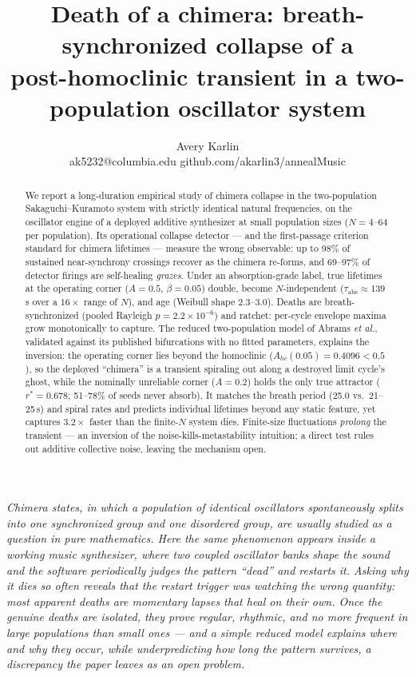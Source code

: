 \documentclass[11pt]{article}
\title{\bfseries Death of a chimera: breath-synchronized collapse of a\\ post-homoclinic transient in a two-population oscillator system}
\author{Avery Karlin\\ \small ak5232@columbia.edu \quad github.com/akarlin3/annealMusic}
\date{}
\begin{document}
\maketitle

\begin{abstract}
\noindent
We report a long-duration empirical study of chimera collapse in the two-population
Sakaguchi--Kuramoto system with strictly identical natural frequencies, on the
oscillator engine of a deployed additive synthesizer at small population sizes
($N = 4$--$64$ per population). Its operational collapse detector --- and the
first-passage criterion standard for chimera lifetimes --- measure the wrong
observable: up to 98\% of sustained near-synchrony crossings recover as the chimera
re-forms, and 69--97\% of detector firings are self-healing \emph{grazes}.
Under an absorption-grade label, true lifetimes at the operating corner ($A = 0.5$,
$\beta = 0.05$) double, become $N$-independent ($\tau_{\mathrm{abs}} \approx 139$\,s
over a $16\times$ range of $N$), and age (Weibull shape $2.3$--$3.0$). Deaths are
breath-synchronized (pooled Rayleigh $p = 2.2\times10^{-6}$) and ratchet: per-cycle
envelope maxima grow monotonically to capture. The reduced two-population model of
Abrams \emph{et al.}, validated against its published bifurcations with no fitted
parameters, explains the inversion: the operating corner lies beyond the homoclinic
($A_{hc}(0.05) = 0.4096 < 0.5$), so the deployed ``chimera'' is a transient
spiraling out along a destroyed limit cycle's ghost, while the nominally unreliable
corner ($A = 0.2$) holds the only true attractor ($r^* = 0.678$; 51--78\%
of seeds never absorb). It matches the breath period (25.0 vs.\ 21--25\,s) and
spiral rates and predicts individual lifetimes beyond any static feature, yet
captures $3.2\times$ faster than the finite-$N$ system dies. Finite-size
fluctuations \emph{prolong} the transient --- an inversion of the
noise-kills-metastability intuition; a direct test rules out additive collective
noise, leaving the mechanism open.
\end{abstract}

\noindent\textit{Chimera states, in which a population of identical oscillators
spontaneously splits into one synchronized group and one disordered group, are
usually studied as a question in pure mathematics. Here the same phenomenon appears
inside a working music synthesizer, where two coupled oscillator banks shape the
sound and the software periodically judges the pattern ``dead'' and restarts it.
Asking why it dies so often reveals that the restart trigger was watching the wrong
quantity: most apparent deaths are momentary lapses that heal on their own. Once the
genuine deaths are isolated, they prove regular, rhythmic, and no more frequent in
large populations than small ones --- and a simple reduced model explains where and
why they occur, while underpredicting how long the pattern survives, a discrepancy
the paper leaves as an open problem.}
\end{document}
